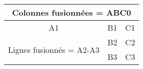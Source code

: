 \begin{tabular}{|c|c|c|}
\hline
	\multicolumn{3}{|c|}{Colonnes fusionnées = ABC0} \\
	\hline
	A1 & B1 & C1 \\
	\hline
	\multirow{2}{*}{Lignes fusionnés = A2-A3}
	& B2 & C2 \\
	\cline{2-3}
	& B3 & C3 \\
\hline
\end{tabular}